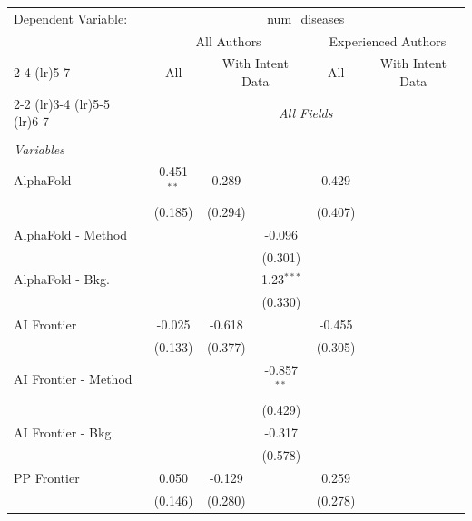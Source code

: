 \begingroup
\centering
\begin{tabular}{lcccccc}
   \tabularnewline \midrule \midrule
   Dependent Variable: & \multicolumn{6}{c}{num\_diseases}\\
 & \multicolumn{3}{c}{All Authors} & \multicolumn{3}{c}{Experienced Authors} \\
\cmidrule(lr){2-4} \cmidrule(lr){5-7}
 & \multicolumn{1}{c}{All} & \multicolumn{2}{c}{With Intent Data} & \multicolumn{1}{c}{All} & \multicolumn{2}{c}{With Intent Data} \\
\cmidrule(lr){2-2} \cmidrule(lr){3-4} \cmidrule(lr){5-5} \cmidrule(lr){6-7}
 & \multicolumn{6}{c}{\textit{All Fields}} \\ \\
   \emph{Variables}\\
   AlphaFold            & 0.451$^{**}$ & 0.289   &               & 0.429   &        &   \\   
                        & (0.185)      & (0.294) &               & (0.407) &        &   \\   
   AlphaFold - Method   &              &         & -0.096        &         &        &   \\   
                        &              &         & (0.301)       &         &        &   \\   
   AlphaFold - Bkg.     &              &         & 1.23$^{***}$  &         &        &   \\   
                        &              &         & (0.330)       &         &        &   \\   
   AI Frontier          & -0.025       & -0.618  &               & -0.455  &        &   \\   
                        & (0.133)      & (0.377) &               & (0.305) &        &   \\   
   AI Frontier - Method &              &         & -0.857$^{**}$ &         &        &   \\   
                        &              &         & (0.429)       &         &        &   \\   
   AI Frontier - Bkg.   &              &         & -0.317        &         &        &   \\   
                        &              &         & (0.578)       &         &        &   \\   
   PP Frontier          & 0.050        & -0.129  &               & 0.259   &        &   \\   
                        & (0.146)      & (0.280) &               & (0.278) &        &   \\   

\end{tabular}

